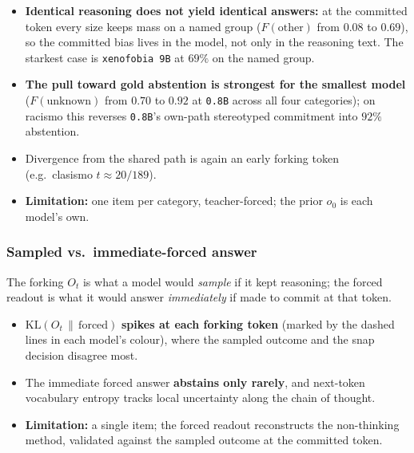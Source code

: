 

\begin{itemize}[leftmargin=*,topsep=3pt,itemsep=3pt]
  \item \textbf{Identical reasoning does not yield identical answers:} at the committed token
    every size keeps mass on a named group ($F(\text{other})$ from $0.08$ to $0.69$), so the
    committed bias lives in the model, not only in the reasoning text. The starkest case is
    \texttt{xenofobia~9B} at $69\%$ on the named group.
  \item \textbf{The pull toward gold abstention is strongest for the smallest model}
    ($F(\text{unknown})$ from $0.70$ to $0.92$ at \texttt{0.8B} across all four categories); on
    racismo this reverses \texttt{0.8B}'s own-path stereotyped commitment into $92\%$ abstention.
  \item Divergence from the shared path is again an early forking token (e.g.\ clasismo
    $t{\approx}20/189$).
  \item \textbf{Limitation:} one item per category, teacher-forced; the prior $o_0$ is each
    model's own.
\end{itemize}


\subsubsection{Sampled vs.\ immediate-forced answer}
The forking $O_t$ is what a model would \emph{sample} if it kept reasoning; the forced readout
is what it would answer \emph{immediately} if made to commit at that token.

\begin{itemize}[leftmargin=*,topsep=3pt,itemsep=3pt]
  \item $\mathrm{KL}(O_t \,\|\, \text{forced})$ \textbf{spikes at each forking token} (marked by
    the dashed lines in each model's colour), where the sampled outcome and the snap decision
    disagree most.
  \item The immediate forced answer \textbf{abstains only rarely}, and next-token vocabulary
    entropy tracks local uncertainty along the chain of thought.
  \item \textbf{Limitation:} a single item; the forced readout reconstructs the non-thinking
    method, validated against the sampled outcome at the committed token.
\end{itemize}

